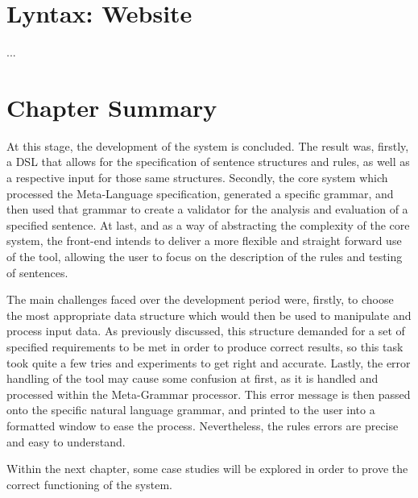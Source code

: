 \section{Lyntax: Website}

...

\section{Chapter Summary}

At this stage, the development of the system is concluded.
The result was, firstly, a DSL that allows for the specification of sentence structures and rules, as well as a respective input for those same structures.
Secondly, the core system which processed the Meta-Language specification, generated a specific grammar, 
and then used that grammar to create a validator for the analysis and evaluation of a specified sentence.
At last, and as a way of abstracting the complexity of the core system, 
the front-end intends to deliver a more flexible and straight forward use of the tool,
allowing the user to focus on the description of the rules and testing of sentences.

The main challenges faced over the development period were, firstly,
to choose the most appropriate data structure which would then be used to manipulate and process input data.
As previously discussed, this structure demanded for a set of specified requirements to be met in order to produce correct results, 
so this task took quite a few tries and experiments to get right and accurate.
Lastly, the error handling of the tool may cause some confusion at first, as it is handled and processed within the Meta-Grammar processor.
This error message is then passed onto the specific natural language grammar, and printed to the user into a formatted window to ease the process.
Nevertheless, the rules errors are precise and easy to understand.

Within the next chapter, some case studies will be explored in order to prove the correct functioning of the system.

